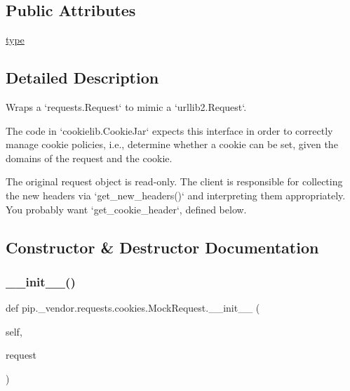 \subsection*{Public Attributes}
\begin{DoxyCompactItemize}
\item 
\hyperlink{classpip_1_1__vendor_1_1requests_1_1cookies_1_1MockRequest_a5689aaee84525b806376c0f9155c4c70}{type}
\end{DoxyCompactItemize}


\subsection{Detailed Description}
\begin{DoxyVerb}Wraps a `requests.Request` to mimic a `urllib2.Request`.

The code in `cookielib.CookieJar` expects this interface in order to correctly
manage cookie policies, i.e., determine whether a cookie can be set, given the
domains of the request and the cookie.

The original request object is read-only. The client is responsible for collecting
the new headers via `get_new_headers()` and interpreting them appropriately. You
probably want `get_cookie_header`, defined below.
\end{DoxyVerb}
 

\subsection{Constructor \& Destructor Documentation}
\mbox{\label{classpip_1_1__vendor_1_1requests_1_1cookies_1_1MockRequest_a6142d0899c92a07f524c3dd44a30cc4a}} 
\subsubsection{\texorpdfstring{\+\_\+\+\_\+init\+\_\+\+\_\+()}{\_\_init\_\_()}}
{\footnotesize\ttfamily def pip.\+\_\+vendor.\+requests.\+cookies.\+Mock\+Request.\+\_\+\+\_\+init\+\_\+\+\_\+ (\begin{DoxyParamCaption}\item[{}]{self,  }\item[{}]{request }\end{DoxyParamCaption})}



